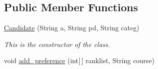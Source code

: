 \subsection*{Public Member Functions}
\begin{DoxyCompactItemize}
\item 
\hyperlink{classalgo1_1_1Candidate_a10018c508dbdb9b5ebe321fa8ebb5b02}{Candidate} (String a, String pd, String categ)
\begin{DoxyCompactList}\small\item\em This is the constructor of the class. \end{DoxyCompactList}\item 
\hypertarget{classalgo1_1_1Candidate_a1a1bb9814f55f7490e63665096140994}{void \hyperlink{classalgo1_1_1Candidate_a1a1bb9814f55f7490e63665096140994}{add\+\_\+preference} (int\mbox{[}$\,$\mbox{]} ranklist, String course)}\label{classalgo1_1_1Candidate_a1a1bb9814f55f7490e63665096140994}


\end{DoxyCompactItemize}
